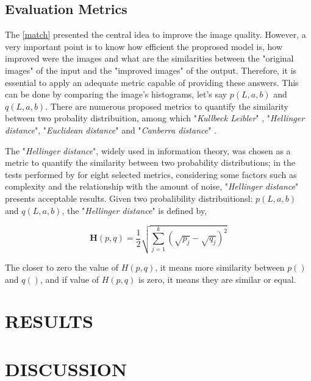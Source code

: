 \documentclass{article}
\begin{document}
\subsection{Evaluation Metrics}

The \ref{match} presented the central idea to improve the image quality. However, a very important point is to know how efficient the proprosed model is, how improved were the images and what are the similarities between the "original images" of the input and the "improved images" of the output. Therefore, it is essential to apply an adequate metric capable of providing these answers. This can be done by comparing the image's histograms, let's say $p(L, a, b)$ and $q(L, a, b)$. There are numerous proposed metrics to quantify the similarity between two probality distribuition, among which "\textit{Kullbeck Leibler}" \citep{AssessingInformationContentinColorImages}, "\textit{Hellinger distance}", "\textit{Euclidean distance}" and "\textit{Canberra distance}" \citep{BanchmarckSimiliraty}. 

The "\textit{Hellinger distance}", widely used in information theory, was chosen as a metric to quantify the similarity between two probability distributions; in the tests performed by \citep{BanchmarckSimiliraty} for eight selected metrics, considering some factors such as complexity and the relationship with the amount of noise, "\textit{Hellinger distance}" presents acceptable results. Given two probalibility distribuitionsl: $p(L, a, b)$ and $q(L, a, b)$, the "\textit{Hellinger distance}" is defined by,

\begin{equation}
    \bm H(p, q) = \frac{1}{2}\sqrt{\sum_{j=1}^k (\sqrt{p_j} - \sqrt{q_j})^2}
\end{equation}

The closer to zero the value of $H(p, q)$, it means more similarity between $p()$ and $q()$, and if value of $H(p, q)$ is zero, it means they are similar or equal.











\section{RESULTS}
\label{sec:pagestyle}


\section{DISCUSSION}
\label{sec:typestyle}




\end{document}

